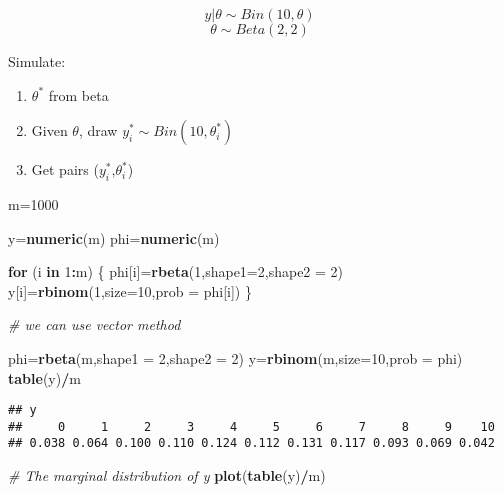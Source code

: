 \documentclass[
]{book}
\newenvironment{Shaded}{\begin{snugshade}}{\end{snugshade}}
\newcommand{\CommentTok}[1]{\textcolor[rgb]{0.56,0.35,0.01}{\textit{#1}}}
\newcommand{\ControlFlowTok}[1]{\textcolor[rgb]{0.13,0.29,0.53}{\textbf{#1}}}
\newcommand{\DataTypeTok}[1]{\textcolor[rgb]{0.13,0.29,0.53}{#1}}
\newcommand{\DecValTok}[1]{\textcolor[rgb]{0.00,0.00,0.81}{#1}}
\newcommand{\KeywordTok}[1]{\textcolor[rgb]{0.13,0.29,0.53}{\textbf{#1}}}
\newcommand{\NormalTok}[1]{#1}
\newcommand{\OperatorTok}[1]{\textcolor[rgb]{0.81,0.36,0.00}{\textbf{#1}}}
\begin{document}
\[y|\theta \sim Bin(10, \theta)\]
\[\theta \sim Beta(2,2)\]

Simulate:

\begin{enumerate}
\def\labelenumi{(\arabic{enumi})}
\item
  \(\theta^*\) from beta
\item
  Given \(\theta\), draw \(y_i^* \sim Bin(10, \theta_i^*)\)
\item
  Get pairs (\(y_i^*\),\(\theta_i^*\))
\end{enumerate}

\begin{Shaded}
\begin{Highlighting}[]
\NormalTok{m=}\DecValTok{1000}

\NormalTok{y=}\KeywordTok{numeric}\NormalTok{(m)}
\NormalTok{phi=}\KeywordTok{numeric}\NormalTok{(m)}

\ControlFlowTok{for}\NormalTok{ (i }\ControlFlowTok{in} \DecValTok{1}\OperatorTok{:}\NormalTok{m)}
\NormalTok{\{}
\NormalTok{  phi[i]=}\KeywordTok{rbeta}\NormalTok{(}\DecValTok{1}\NormalTok{,}\DataTypeTok{shape1=}\DecValTok{2}\NormalTok{,}\DataTypeTok{shape2 =} \DecValTok{2}\NormalTok{)}
\NormalTok{  y[i]=}\KeywordTok{rbinom}\NormalTok{(}\DecValTok{1}\NormalTok{,}\DataTypeTok{size=}\DecValTok{10}\NormalTok{,}\DataTypeTok{prob =}\NormalTok{ phi[i])}
\NormalTok{\}}

\CommentTok{# we can use vector method}

\NormalTok{phi=}\KeywordTok{rbeta}\NormalTok{(m,}\DataTypeTok{shape1 =} \DecValTok{2}\NormalTok{,}\DataTypeTok{shape2 =} \DecValTok{2}\NormalTok{)}
\NormalTok{y=}\KeywordTok{rbinom}\NormalTok{(m,}\DataTypeTok{size=}\DecValTok{10}\NormalTok{,}\DataTypeTok{prob =}\NormalTok{ phi)}
\KeywordTok{table}\NormalTok{(y)}\OperatorTok{/}\NormalTok{m}
\end{Highlighting}
\end{Shaded}

\begin{verbatim}
## y
##     0     1     2     3     4     5     6     7     8     9    10 
## 0.038 0.064 0.100 0.110 0.124 0.112 0.131 0.117 0.093 0.069 0.042
\end{verbatim}

\begin{Shaded}
\begin{Highlighting}[]
\CommentTok{# The marginal distribution of y}
\KeywordTok{plot}\NormalTok{(}\KeywordTok{table}\NormalTok{(y)}\OperatorTok{/}\NormalTok{m)}
\end{Highlighting}
\end{Shaded}
\end{document}
